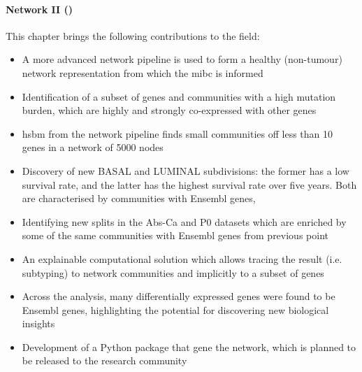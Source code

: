 \paragraph*{Network II ()}

This chapter brings the following contributions to the field:
\begin{itemize}
    \item A more advanced network pipeline is used to form a healthy (non-tumour) network representation from which the \acrshort{mibc} is informed
    \item Identification of a subset of genes and communities with a high mutation burden, which are highly and strongly co-expressed with other genes
    \item \acrfull{hsbm} from the network pipeline finds small communities off less than 10 genes in a network of 5000 nodes
    \item Discovery of new \gls{BASAL} and \gls{LUMINAL} subdivisions: the former has a low survival rate, and the latter has the highest survival rate over five years. Both are characterised by communities with Ensembl genes,
    \item Identifying new splits in the Abs-Ca and P0 datasets which are enriched by some of the same communities with Ensembl genes from previous point 
    \item An explainable computational solution which allows tracing the result (i.e. subtyping) to network communities and implicitly to a subset of genes
    \item Across the analysis, many differentially expressed genes were found to be Ensembl genes, highlighting the potential for discovering new biological insights
    \item Development of a Python package that gene the network, which is planned to be released to the research community
\end{itemize}